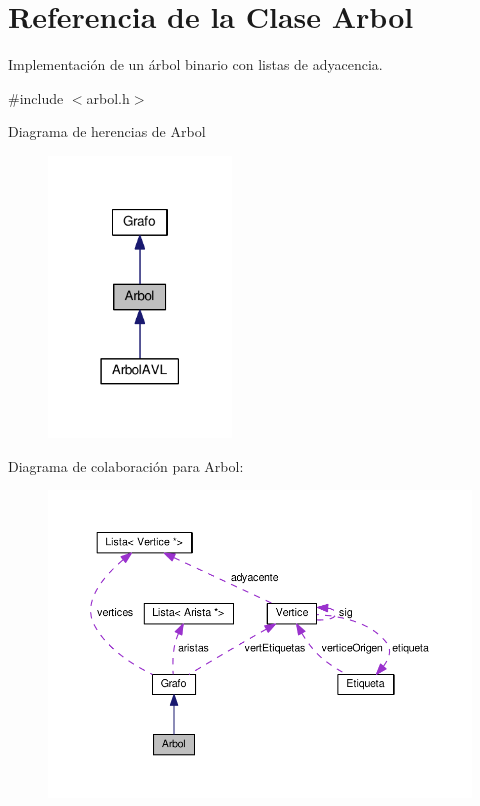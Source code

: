 \hypertarget{classArbol}{}\section{Referencia de la Clase Arbol}
\label{classArbol}


Implementación de un árbol binario con listas de adyacencia. ~\newline
  




{\ttfamily \#include $<$arbol.\+h$>$}



Diagrama de herencias de Arbol\nopagebreak
\begin{figure}[H]
\begin{center}
\leavevmode
\includegraphics[width=138pt]{classArbol__inherit__graph}
\end{center}
\end{figure}


Diagrama de colaboración para Arbol\+:\nopagebreak
\begin{figure}[H]
\begin{center}
\leavevmode
\includegraphics[width=350pt]{classArbol__coll__graph}
\end{center}
\end{figure}
